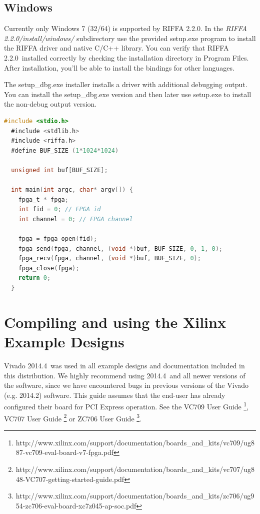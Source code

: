 \documentclass{refrep}
\newcommand{\VivadoVer}{2014.4}
\newcommand{\RIFFAVer}{2.2.0}
\newcommand{\Directory}[1]{\textit{#1}}
\begin{document}
\section{Windows}
Currently only Windows 7 (32/64) is supported by RIFFA \RIFFAVer. In the
\Directory{RIFFA \RIFFAVer/install/windows/} subdirectory use the
provided setup.exe program to install the RIFFA driver and native C/C++
library. You can verify that RIFFA \RIFFAVer~installed correctly by checking
the installation directory in Program Files. After installation, you'll be able
to install the bindings for other languages.

The setup\_dbg.exe installer installs a driver with additional debugging output.
You can install the setup\_dbg.exe version and then later use setup.exe to
install the non-debug output version.

\begin{lstlisting}[basicstyle=\footnotesize\ttfamily,language=C,
    commentstyle=\color{red},label=Listing:RIFFA:Include,
    caption=Inclusion of the RIFFA header files in a user application,frame=single]
  #include <stdio.h>
  #include <stdlib.h>
  #include <riffa.h>
  #define BUF_SIZE (1*1024*1024)

  unsigned int buf[BUF_SIZE];

  int main(int argc, char* argv[]) {
    fpga_t * fpga;
    int fid = 0; // FPGA id
    int channel = 0; // FPGA channel

    fpga = fpga_open(fid);
    fpga_send(fpga, channel, (void *)buf, BUF_SIZE, 0, 1, 0);
    fpga_recv(fpga, channel, (void *)buf, BUF_SIZE, 0);
    fpga_close(fpga);
    return 0;
  }
\end{lstlisting}


\chapter{Compiling and using the Xilinx Example Designs}
Vivado \VivadoVer~was used in all example designs and documentation included in
this distribution. We highly recommend using \VivadoVer~and all newer versions
of the software, since we have encountered bugs in previous versions of the
Vivado (e.g. 2014.2) software. This guide assumes that the end-user has already
configured their board for PCI Express operation. See the VC709 User Guide
\footnote{http://www.xilinx.com/support/documentation/boards\_and\_kits/vc709/ug887-vc709-eval-board-v7-fpga.pdf},
VC707 User Guide
\footnote{http://www.xilinx.com/support/documentation/boards\_and\_kits/vc707/ug848-VC707-getting-started-guide.pdf}
or ZC706 User Guide
\footnote{http://www.xilinx.com/support/documentation/boards\_and\_kits/zc706/ug954-zc706-eval-board-xc7z045-ap-soc.pdf}.
\end{document}
